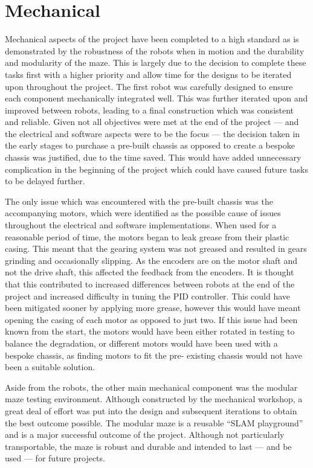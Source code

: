 \section{Mechanical}\label{eval/mech} 
Mechanical aspects of the project have been completed to a 
high standard as is demonstrated by the robustness of the robots when in 
motion and the durability and modularity of the maze. This is largely due to the 
decision to complete these tasks first with a higher priority and allow time for the 
designs to be iterated upon throughout the project. The first robot was carefully 
designed to ensure each component mechanically integrated well. This was further 
iterated upon and improved between robots, leading to a final construction which was 
consistent and reliable. Given not all objectives were met at the end of the project 
--- and the electrical and software aspects were to be the focus --- the decision taken in the 
early stages to purchase a pre-built chassis as opposed to create a bespoke chassis 
was justified, due to the time saved. This would have added unnecessary complication 
in the beginning of the project which could have caused future 
tasks to be delayed further. 

The only issue which was encountered with the pre-built chassis was the 
accompanying motors, which were identified as the possible cause of 
issues throughout the electrical and software implementations. When used 
for a reasonable period of time, the motors began to leak grease from 
their plastic casing. This meant that the gearing system was not greased 
and resulted in gears grinding and occasionally slipping. As the 
encoders are on the motor shaft and not the drive shaft, this affected 
the feedback from the encoders. It is thought that this contributed to 
increased differences between robots at the end of the project and 
increased difficulty in tuning the PID controller. This could have been 
mitigated sooner by applying more grease, however this would have meant 
opening the casing of each motor as opposed to just two. If this issue 
had been known from the start, the motors would have been either rotated 
in testing to balance the degradation, or different motors would have 
been used with a bespoke chassis, as finding motors to fit the pre-
existing chassis would not have been a suitable solution. 

Aside from the robots, the other main mechanical component was the modular maze 
testing environment. Although constructed by the mechanical workshop, a great deal of 
effort was put into the design and subsequent iterations to obtain the best outcome 
possible. The modular maze is a reusable ``SLAM playground'' and is a major 
successful outcome of the project. Although not particularly transportable, the maze 
is robust and durable and intended to last --- and be used --- for future projects.


